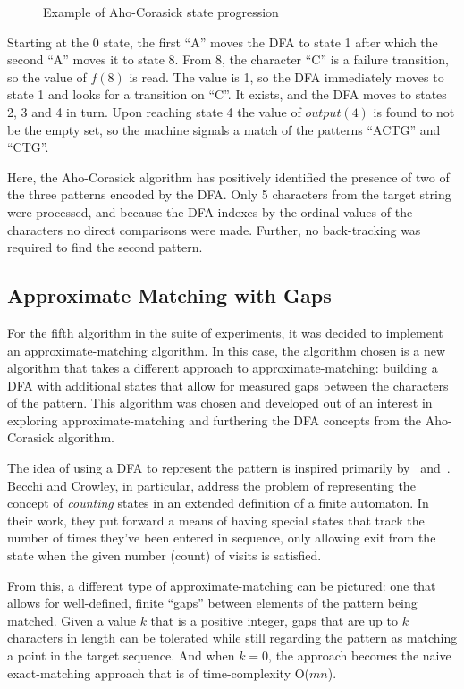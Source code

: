 \begin{figure}[ht]
\centering

\caption{Example of Aho-Corasick state progression}
\label{fig:ac_progression}
\end{figure}

Starting at the 0 state, the first ``A'' moves the DFA to state 1 after which the second ``A'' moves it to state 8. From 8, the character ``C'' is a failure transition, so the value of $f(8)$ is read. The value is 1, so the DFA immediately moves to state 1 and looks for a transition on ``C''. It exists, and the DFA moves to states 2, 3 and 4 in turn. Upon reaching state 4 the value of $output(4)$ is found to not be the empty set, so the machine signals a match of the patterns ``ACTG'' and ``CTG''.

Here, the Aho-Corasick algorithm has positively identified the presence of two of the three patterns encoded by the DFA. Only 5 characters from the target string were processed, and because the DFA indexes by the ordinal values of the characters no direct comparisons were made. Further, no back-tracking was required to find the second pattern.

\subsection{Approximate Matching with Gaps}
\label{subsec:dfa_gap}

For the fifth algorithm in the suite of experiments, it was decided to implement an approximate-matching algorithm. In this case, the algorithm chosen is a new algorithm that takes a different approach to approximate-matching: building a DFA with additional states that allow for measured gaps between the characters of the pattern. This algorithm was chosen and developed out of an interest in exploring approximate-matching and furthering the DFA concepts from the Aho-Corasick algorithm.

The idea of using a DFA to represent the pattern is inspired primarily by~\cite{aho} and~\cite{becchi}. Becchi and Crowley, in particular, address the problem of representing the concept of \textit{counting} states in an extended definition of a finite automaton. In their work, they put forward a means of having special states that track the number of times they've been entered in sequence, only allowing exit from the state when the given number (count) of visits is satisfied.

From this, a different type of approximate-matching can be pictured: one that allows for well-defined, finite ``gaps'' between elements of the pattern being matched. Given a value $k$ that is a positive integer, gaps that are up to $k$ characters in length can be tolerated while still regarding the pattern as matching a point in the target sequence. And when $k = 0$, the approach becomes the naive exact-matching approach that is of time-complexity O($mn$).

